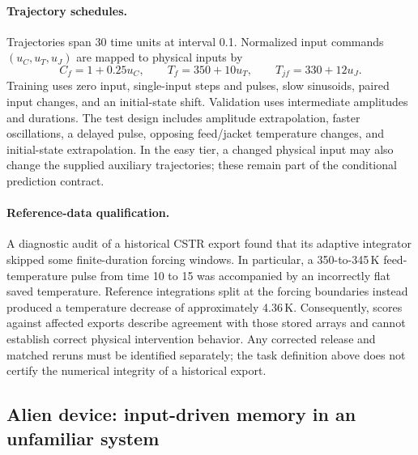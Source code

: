 \paragraph{Trajectory schedules.}
Trajectories span 30 time units at interval 0.1. Normalized input commands
$(u_C,u_T,u_J)$ are mapped to physical inputs by
\begin{equation}
C_f=1+0.25u_C,\qquad T_f=350+10u_T,\qquad T_{jf}=330+12u_J.
\end{equation}
Training uses zero input, single-input steps and pulses, slow sinusoids,
paired input changes, and an initial-state shift. Validation uses intermediate
amplitudes and durations. The test design includes amplitude extrapolation,
faster oscillations, a delayed pulse, opposing feed/jacket temperature changes,
and initial-state extrapolation. In the easy tier, a changed physical input may
also change the supplied auxiliary trajectories; these remain part of the
conditional prediction contract.

\paragraph{Reference-data qualification.}
A diagnostic audit of a historical CSTR export found that its adaptive
integrator skipped some finite-duration forcing windows. In particular, a
350-to-345\,K feed-temperature pulse from time 10 to 15 was accompanied by an
incorrectly flat saved temperature. Reference integrations split at the forcing
boundaries instead produced a temperature decrease of approximately 4.36\,K.
Consequently, scores against affected exports describe agreement with those
stored arrays and cannot establish correct physical intervention behavior.
Any corrected release and matched reruns must be identified separately;
the task definition above does not certify the numerical integrity of a
historical export.

\subsection{Alien device: input-driven memory in an unfamiliar system}
\label{app:benchmark_alien}


